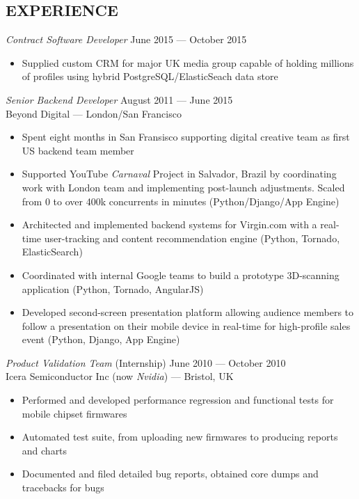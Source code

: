 \documentclass[margin, 10pt]{res}
\begin{document}
\begin{resume}
\section{EXPERIENCE}

{\sl Contract Software Developer} \hfill June 2015 --- October 2015 \\

\begin{itemize} \itemsep -2pt
\item Supplied custom CRM for major UK media group capable of holding millions of profiles using hybrid PostgreSQL/ElasticSeach data store
\end{itemize}

{\sl Senior Backend Developer} \hfill August 2011 --- June 2015 \\
Beyond Digital --- London/San Francisco \\

\begin{itemize} \itemsep -2pt %
\item Spent eight months in San Fransisco supporting digital creative team as first US backend team member
\item Supported YouTube \textit{Carnaval} Project in Salvador, Brazil by coordinating work with London team and implementing post-launch adjustments. Scaled from 0 to over 400k concurrents in minutes (Python/Django/App Engine)
\item Architected and implemented backend systems for Virgin.com with a real-time user-tracking and content recommendation engine (Python, Tornado, ElasticSearch)
\item Coordinated with internal Google teams to build a prototype 3D-scanning application (Python, Tornado, AngularJS)
\item Developed second-screen presentation platform allowing audience members to follow a presentation on their mobile device in real-time for high-profile sales event (Python, Django, App Engine)
\end{itemize}

{\sl Product Validation Team} \hfill (Internship) June 2010 --- October 2010 \\
Icera Semiconductor Inc (now \textit{Nvidia}) --- Bristol, UK \\
\begin{itemize}
\item Performed and developed performance regression and functional tests for mobile chipset firmwares
\item Automated test suite, from uploading new firmwares to producing reports and charts
\item Documented and filed detailed bug reports, obtained core dumps and tracebacks for bugs
\end{itemize}


\end{resume}
\end{document}
